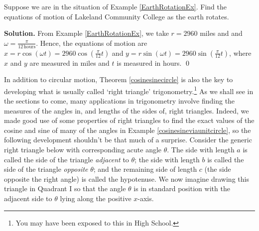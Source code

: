 \begin{ex}  Suppose we are in the situation of Example \ref{EarthRotationEx}.  Find the equations of motion of Lakeland Community College as the earth rotates.
\label{Lakelandrotates}

\smallskip

{\bf Solution.}  From Example \ref{EarthRotationEx}, we take $r = 2960$ miles and and $\omega = \frac{\pi}{12 \, \text{hours}}$.  Hence, the equations of motion are $x =  r \cos(\omega t) = 2960 \cos\left(\frac{\pi}{12} t\right)$ and  $y =  r \sin(\omega t) = 2960 \sin\left(\frac{\pi}{12} t\right)$, where $x$ and $y$ are measured in miles and $t$ is measured in hours. \qed

\end{ex}

In addition to circular motion, Theorem \ref{cosinesinecircle} is also the key to developing what is usually called `right triangle' trigonometry.\footnote{You may have been exposed to this in High School.}  As we shall see in the sections to come, many applications in trigonometry involve finding the measures of the angles in, and lengths of the sides of, right triangles.  Indeed, we made good use of some properties of right triangles to find the exact values of the cosine and sine of many of the angles in Example \ref{cosinesineviaunitcircle}, so the following development shouldn't be that much of a surprise.  Consider the generic right triangle below with corresponding acute angle $\theta$. The side with length $a$ is called the side of the triangle \emph{adjacent} to  $\theta$; the side with length $b$ is called the side of the triangle \emph{opposite} $\theta$; and the remaining side of length $c$ (the side opposite the right angle) is called the hypotenuse. We now imagine drawing this triangle in Quadrant I so that the angle $\theta$ is in standard position with the adjacent side to $\theta$ lying along the positive $x$-axis. 

\vspace{.1in}

